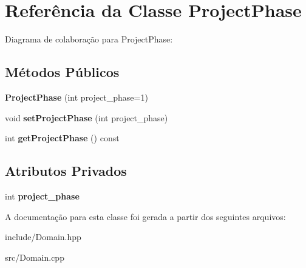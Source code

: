 \hypertarget{classProjectPhase}{}\section{Referência da Classe Project\+Phase}
\label{classProjectPhase}


Diagrama de colaboração para Project\+Phase\+:
\subsection*{Métodos Públicos}
\begin{DoxyCompactItemize}
\item 
{\bfseries Project\+Phase} (int project\+\_\+phase=1)\hypertarget{classProjectPhase_a22ef4b1402f6ddd2c101927bd7793e63}{}\label{classProjectPhase_a22ef4b1402f6ddd2c101927bd7793e63}

\item 
void {\bfseries set\+Project\+Phase} (int project\+\_\+phase)\hypertarget{classProjectPhase_ad3babff97fc60bb738e263fd76ce6245}{}\label{classProjectPhase_ad3babff97fc60bb738e263fd76ce6245}

\item 
int {\bfseries get\+Project\+Phase} () const \hypertarget{classProjectPhase_ae4848dccd98eb7ec3a6ffc2038b15a0f}{}\label{classProjectPhase_ae4848dccd98eb7ec3a6ffc2038b15a0f}

\end{DoxyCompactItemize}
\subsection*{Atributos Privados}
\begin{DoxyCompactItemize}
\item 
int {\bfseries project\+\_\+phase}\hypertarget{classProjectPhase_a32edffe407c553fd0cabd072dc71bdf9}{}\label{classProjectPhase_a32edffe407c553fd0cabd072dc71bdf9}

\end{DoxyCompactItemize}


A documentação para esta classe foi gerada a partir dos seguintes arquivos\+:\begin{DoxyCompactItemize}
\item 
include/Domain.\+hpp\item 
src/Domain.\+cpp\end{DoxyCompactItemize}
